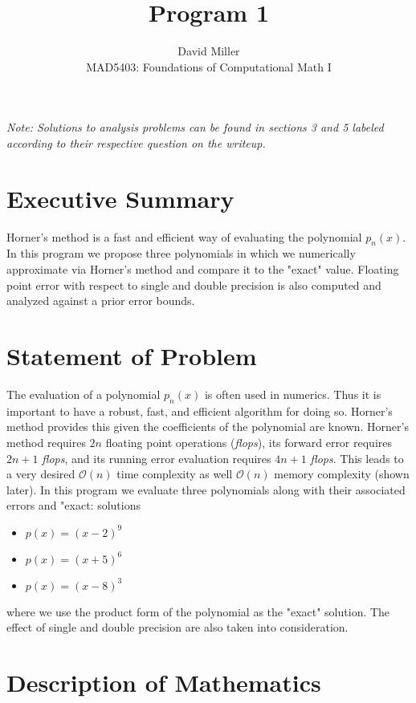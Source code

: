 \documentclass[12pt]{article}
\theoremstyle{remark}
\begin{document}
 
\title{Program 1}
\author{David Miller \\ 
MAD5403: Foundations of Computational Math I} 
 
\maketitle

\textit{Note: Solutions to analysis problems can be found in sections 3 and 5 labeled according to their respective question on the writeup.}

\section{Executive Summary}
Horner's method is a fast and efficient way of evaluating the polynomial $p_n(x)$. In this program we propose three polynomials in which we numerically approximate via Horner's method and compare it to the "exact" value. Floating point error with respect to single and double precision is also computed and analyzed against a prior error bounds. 

\section{Statement of Problem}

The evaluation of a polynomial $p_n(x)$ is often used in numerics. Thus it is important to have a robust, fast, and efficient algorithm for doing so. Horner's method provides this given the coefficients of the polynomial are known. Horner's method requires $2n$ floating point operations (\textit{flops}), its forward error requires $2n+1$ \textit{flops}, and its running error evaluation requires $4n+1$ \textit{flops}. This leads to a very desired $\mathcal{O}(n)$ time complexity as well $\mathcal{O}(n)$ memory complexity (shown later). In this program we evaluate three polynomials along with their associated errors and "exact: solutions
\begin{itemize}
	\item $p(x) = (x - 2)^9$
	\item $p(x) = (x + 5)^6$
	\item $p(x) = (x - 8)^3$
\end{itemize}
where we use the product form of the polynomial as the "exact" solution. The effect of single and double precision  are also taken into consideration. 

\section{Description of Mathematics}
\end{document}
